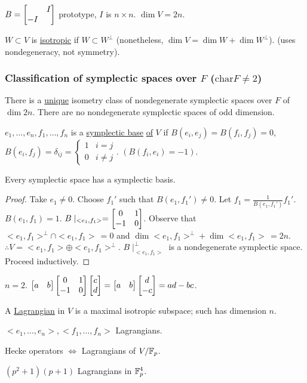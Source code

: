 \documentclass[]{article}
\begin{document}
$B = \begin{bmatrix} & I\\ -I&\end{bmatrix}$ prototype, $I$ is $n\times n$. $\dim V = 2n$.

\begin{remark}
	$W \subset V$ is \ul{isotropic} if $W\subset W^\perp$ (nonetheless, $\dim V = \dim W + \dim W^\perp$). (uses nondegeneracy, not symmetry).
\end{remark}

\subsubsection*{Classification of symplectic spaces over $F$ ($\text{char}F\neq 2$)}

\begin{theorem}
	There is a \ul{unique} isometry class of nondegenerate symplectic spaces over $F$ of $\dim 2n$. There are no nondegenerate symplectic spaces of odd dimension.
\end{theorem}

\begin{definition}
	$e_1,\dots,e_n,f_1,\dots,f_n$ is a \ul{symplectic base} \ul{of} \ul{$V$} if $B(e_i,e_j) = B(f_i,f_j) = 0$, $B(e_i,f_j) = \delta_{ij} = \begin{cases} 1 & i = j \\ 0 & i\neq j \end{cases}$. $(B(f_i,e_i) = -1)$.
\end{definition}

\begin{theorem}
	Every symplectic space has a symplectic basis.
\end{theorem}
\begin{proof}
	Take $e_1 \neq 0$. Choose $f_1'$ such that $B(e_1,f_1') \neq 0$. Let $f_1 = \frac{1}{B(e_1,f_1')}f_1'$. $B(e_1,f_1) = 1$. $B\mid_{<e_1,f_1>} = \begin{bmatrix}0&1\\-1&0\end{bmatrix}$. Observe that $<e_1,f_1>^\perp\cap<e_1,f_1> \,= 0$ and $\dim<e_1,f_1>^\perp + \dim<e_1,f_1> \,= 2n$.
	$\therefore V = <e_1,f_1> \oplus <e_1,f_1>^\perp$. $B\mid_{<e_1,f_1>}^\perp$ is a nondegenerate symplectic space. Proceed inductively.
\end{proof}
\begin{example}
	$n=2$. $\begin{bmatrix}a&b\end{bmatrix} \begin{bmatrix}0&1\\-1&0\end{bmatrix}\begin{bmatrix}c\\d\end{bmatrix} = \begin{bmatrix}a&b\end{bmatrix}\begin{bmatrix}d\\-c\end{bmatrix} = ad-bc$.
\end{example}
\begin{definition}
	A \ul{Lagrangian} in $V$ is a maximal isotropic subspace; such has dimension $n$.
\end{definition}
\begin{example}
	$<e_1,\dots,e_n>,<f_1,\dots,f_n>$ Lagrangians.
\end{example}
Hecke operators $\iff$ Lagrangians of $V/\mathbb{F}_p$.
\begin{example}
	$(p^2+1)(p+1)$ Lagrangians in $\mathbb{F}_p^4$.
\end{example}
\end{document}
